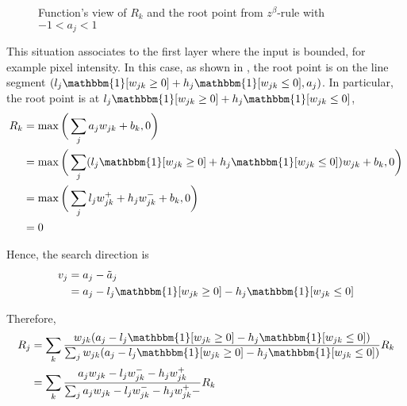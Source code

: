 \begin{figure}[!htb]
\centering
{}
\caption{Function's view of $R_k$ and the root point from $z^\beta$-rule with $-1 < a_j < 1$ }
\label{fig:zbeta_rule_cases}
\end{figure}
This situation associates to the first layer where the input is bounded, for example pixel intensity. In this case, as shown in \addfigure{\ref{fig:zbeta_rule_cases}}, the root point is on the line segment $( l_j \mathbbm{1}[ w_{jk}  \ge 0 ]  + h_j \mathbbm{1}[ w_{jk}  \le 0 ]  , a_j ) $. In particular, the root point is at $l_j \mathbbm{1}[ w_{jk}  \ge 0 ]  + h_j \mathbbm{1}[ w_{jk}  \le 0 ]$,
\begin{align}
R_k &= \max \bigg( \sum_j a_j w_{jk } + b_k, 0 \bigg) \\
&=\max \bigg( \sum_j (l_j \mathbbm{1}[ w_{jk}  \ge 0 ]  + h_j \mathbbm{1}[ w_{jk}  \le 0 ] ) w_{jk } + b_k, 0 \bigg) \\
&= \max \bigg( \sum_j l_j w_{jk }^+   + h_j w_{jk }^-  + b_k, 0 \bigg) \\
&= 0
\end{align}

Hence,  the search direction is 
\begin{align}
	v_j &= a_j - \tilde{a}_j \\
	&=a_j  - l_j \mathbbm{1}[ w_{jk}  \ge 0 ]  - h_j \mathbbm{1}[ w_{jk}  \le 0 ]
\end{align}

Therefore, 
\begin{align}
		R_j &=	\sum_k \frac{ w_{jk}  (a_j  - l_j \mathbbm{1}[ w_{jk}  \ge 0 ]  - h_j \mathbbm{1}[ w_{jk}  \le 0 ]) }{\sum_{j} w_{jk}  (a_j  - l_j \mathbbm{1}[ w_{jk}  \ge 0 ] - h_j \mathbbm{1}[ w_{jk}  \le 0 ]) }  R_k\\
		&=	\sum_k  \frac{ a_j  w_{jk} - l_j w_{jk}^- - h_j w_{jk}^+  }{\sum_{j}   a_j  w_{jk} - l_j w_{jk}^- - h_j w_{jk}^+  -}  R_k
\end{align}





%

